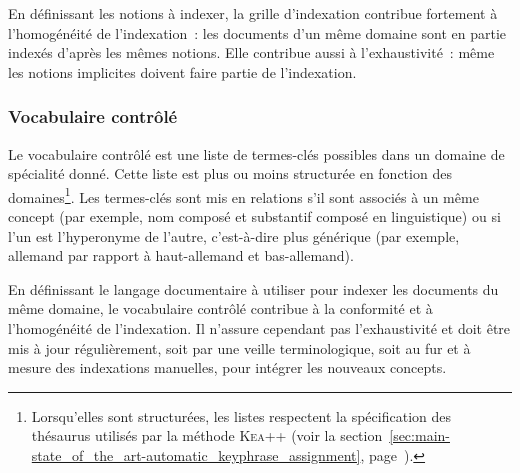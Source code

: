         En définissant les notions à indexer, la grille d'indexation contribue
        fortement à l'homogénéité de l'indexation~: les documents d'un même
        domaine sont en partie indexés d'après les mêmes notions. Elle contribue
        aussi à l'exhaustivité~: même les notions implicites doivent faire
        partie de l'indexation.

      \subsubsection{Vocabulaire contrôlé}
      \label{subsubsec:main-domain_specific_keyphrase_annotation-manual_keyphrase_annotation-resources-controlled_vocabulary}
        Le vocabulaire contrôlé est une liste de termes-clés possibles dans un
        domaine de spécialité donné. Cette liste est plus ou moins structurée en
        fonction des domaines\footnote{Lorsqu'elles sont structurées, les listes
        respectent la spécification des thésaurus utilisés par la méthode
        \textsc{Kea++} (voir la
        section~\ref{sec:main-state_of_the_art-automatic_keyphrase_assignment},
        page~\pageref{sec:main-state_of_the_art-automatic_keyphrase_assignment}).}.
        Les termes-clés sont mis en relations s'il sont associés à un même
        concept (par exemple, \og{}nom composé\fg{} et \og{}substantif
        composé\fg{} en linguistique) ou si l'un est l'hyperonyme de l'autre,
        c'est-à-dire plus  générique (par exemple, \og{}allemand\fg{} par
        rapport à \og{}haut-allemand\fg{} et \og{}bas-allemand\fg{}).
        
        En définissant le langage documentaire à utiliser pour indexer les
        documents du même domaine, le vocabulaire contrôlé contribue à la
        conformité et à l'homogénéité de l'indexation. Il n'assure cependant pas
        l'exhaustivité et doit être mis à jour régulièrement, soit par une
        veille terminologique, soit au fur et à mesure des indexations
        manuelles, pour intégrer les nouveaux concepts.

